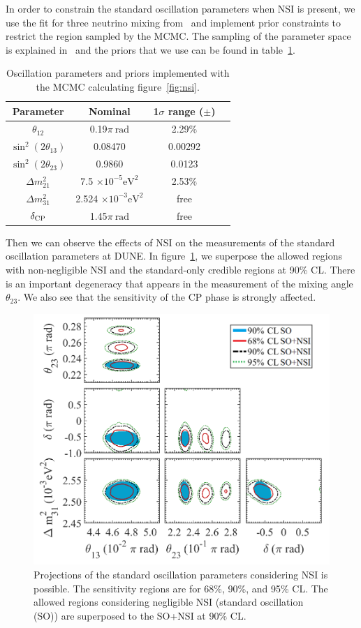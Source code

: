 In order to constrain the standard oscillation parameters when NSI is present, we use the fit for three neutrino mixing from~\cite{Gonzalez-Garcia:2013usa} and implement prior constraints to restrict the region sampled by the MCMC. The sampling of the parameter space is explained in~\cite{Coloma:2015kiu} and the priors that we use can be found in table~\ref{tab:priors1}.
\begin{table}[htb]
\caption{Oscillation parameters and priors implemented with the MCMC calculating figure~\ref{fig:nsi}.} \label{tab:priors1}
\begin{center}
\begin{tabular}{cccc}
\hline
\hline
Parameter&Nominal&1$\sigma$ range ($\pm$)\\ 
\hline
$\theta_{12}$ &0.19$\pi~\textrm{rad}$&2.29\%\\
$\sin^2(2\theta_{13})$ &0.08470&0.00292\\
$\sin^2(2\theta_{23})$ &0.9860&0.0123\\
$\Delta m^2_{21} $ &7.5 $\times10^{-5}\textrm{eV}^2$&2.53\%\\
$\Delta m^2_{31} $ &2.524 $\times10^{-3}\textrm{eV}^2$&free\\
$\delta_{\rm CP} $ &1.45$\pi~\textrm{rad}$&free\\
\hline 
\hline
\end{tabular}
\end{center}
\end{table}

Then we can observe the effects of NSI on the measurements of the standard oscillation parameters at DUNE. In figure~\ref{fig:standar-nsi}, we superpose the allowed regions with non-negligible NSI and the standard-only credible regions at 90\% CL. There is an important degeneracy that appears in the measurement of the mixing angle $\theta_{23}$. We also see that the sensitivity of the CP phase is strongly affected.
\begin{figure}[!htb]
	\centering
    \includegraphics[width=0.6\columnwidth]{graphics/TDR10.pdf}
   \caption[]{\label{fig:standar-nsi}Projections of the standard oscillation parameters considering NSI is possible. The sensitivity regions are for 68\%, 90\%, and 95\% CL. The allowed regions considering negligible NSI (standard oscillation (SO)) are superposed to the SO+NSI at 90\% CL.}
\end{figure}


